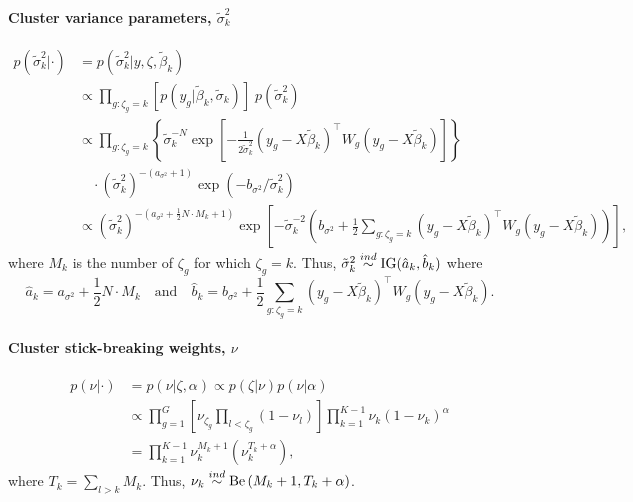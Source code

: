 \paragraph{Cluster variance parameters, $\tilde{\sigma}^2_k$}
\begin{align*}
p(\tilde{\sigma}^2_k|\cdot) & = p(\tilde{\sigma}^2_k|y, \zeta, \tilde{\beta}_k) \\
& \propto \prod_{g:\zeta_g=k} \left[ p(y_g|\tilde{\beta}_k, \tilde{\sigma}_k)\right]\; p(\tilde{\sigma}^2_k)\\
& \propto \prod_{g:\zeta_g=k}  \left\{ \tilde{\sigma}_k^{-N} \exp \left[ -\frac{1}{2\tilde{\sigma}^2_k} \left( y_g - X\tilde{\beta}_k \right)^\top W_g \left( y_g - X\tilde{\beta}_k \right) \right]\right\}\\
& \quad \cdot (\tilde{\sigma}_k^2)^{-(a_{\sigma^2}+1)} \exp\left(-b_{\sigma^2}/\tilde{\sigma}^2_k\right)\\
& \propto (\tilde{\sigma}_k^2)^{-(a_{\sigma^2} + \frac{1}{2}N\cdot M_k + 1)} \exp \left[ -\tilde{\sigma}_k^{-2} \left( b_{\sigma^2} + \frac{1}{2} \sum_{g:\zeta_g=k} \left( y_g - X\tilde{\beta}_k \right)^\top W_g \left( y_g - X\tilde{\beta}_k \right) \right) \right],
\end{align*}
where $M_k$ is the number of $\zeta_g$ for which $\zeta_g=k$.
Thus, $\tilde{\sigma}^2_k \stackrel{ind}{\sim} \operatorname{IG}(\hat{a}_k, \hat{b}_k)$ where
\begin{equation*}
\hat{a}_k=a_{\sigma^2} + \frac{1}{2}N\cdot M_k \quad \mbox{and} \quad \hat{b}_k=b_{\sigma^2} + \frac{1}{2} \sum_{g:\zeta_g=k} \left( y_g - X\tilde{\beta}_k \right)^\top W_g \left( y_g - X\tilde{\beta}_k \right).
\end{equation*}

\paragraph{Cluster stick-breaking weights, $\nu$}
\begin{align*}
p(\nu|\cdot) & = p(\nu|\zeta,\alpha) \propto p(\zeta|\nu) p(\nu|\alpha)\\
& \propto \prod_{g=1}^G \left[ \nu_{\zeta_g} \prod_{l<\zeta_g}(1-\nu_l) \right] \prod_{k=1}^{K-1} \nu_k(1-\nu_k)^\alpha\\
& = \prod_{k=1}^{K-1} \nu_k^{M_k+1}(\nu_k^{T_k+\alpha}),
\end{align*}
where $T_k = \sum_{l>k}M_k$.
Thus, $\nu_k \stackrel{ind}{\sim} \operatorname{Be}\left(M_k+1, T_k+\alpha\right)$.

